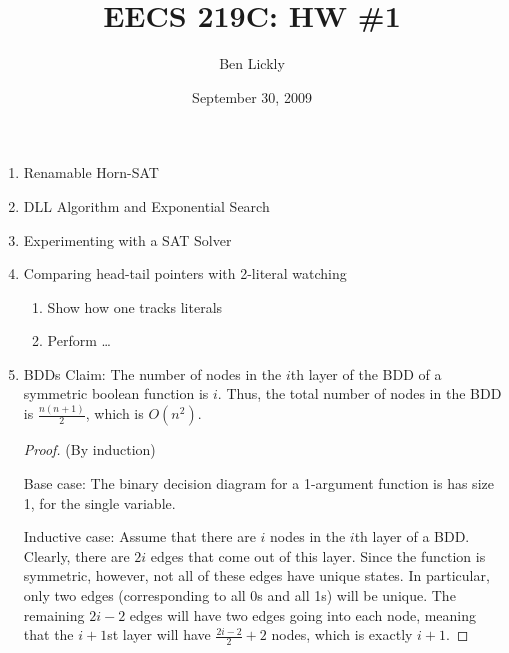 \documentclass{amsart}
\title{EECS 219C: HW \#1}
\author{Ben Lickly}
\date{September 30, 2009}
\begin{document}
\begin{enumerate}
  \item Renamable Horn-SAT
  \item DLL Algorithm and Exponential Search
  \item Experimenting with a SAT Solver
  \item Comparing head-tail pointers with 2-literal watching
    \begin{enumerate}
      \item Show how one tracks literals
      \item Perform \ldots
    \end{enumerate}
  \item BDDs
    Claim: The number of nodes in the $i$th layer of the BDD of a symmetric
    boolean function is $i$.  Thus, the total number of nodes in the BDD is
    $\frac{n (n+1)}{2}$, which is $O(n^2)$.
\begin{proof}
  (By induction)

  Base case: The binary decision diagram for a 1-argument function is has size
  1, for the single variable.

  Inductive case:  Assume that there are $i$ nodes in the $i$th layer of a BDD.
  Clearly, there are $2i$ edges that come out of this layer.
  Since the function is symmetric, however, not all of these edges have unique
  states.  In particular, only two edges (corresponding to all 0s and all 1s)
  will be unique.  The remaining $2i - 2$ edges will have two edges going into
  each node, meaning that the $i+1$st layer will have $\frac{2i -2}{2} + 2$
  nodes, which is exactly $i+1$.
\end{proof}
\end{enumerate}
\end{document}
